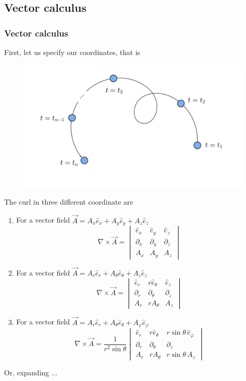 \documentclass[11pt,]{beamer}
\begin{document}
\subsection{Vector calculus}
\begin{frame}
\frametitle{Vector calculus}
	First, let us specify our coordinates, that is
	\begin{figure}
	\includegraphics[page=12,width=1.0\textwidth]{imgs.pdf}
	\end{figure}
\end{frame}
\begin{frame}
	The curl in three different coordinate are
	\begin{enumerate}
	\item For a vector field $\vec{A} = A_x \hat{e}_x + A_y \hat{e}_y + A_z \hat{e}_z$
		\begin{equation}
		\nabla \times \vec{A} = 
		\begin{vmatrix}
		\hat{e}_x & \hat{e}_y & \hat{e}_z\\
		\partial_x & \partial_y & \partial_z\\
		A_x & A_y & A_z
		\end{vmatrix}
		\end{equation}
	\item For a vector field $\vec{A} = A_r \hat{e}_r + A_\theta \hat{e}_\theta + A_z \hat{e}_z$
		\begin{equation}
		\nabla \times \vec{A} = 
		\begin{vmatrix}
		\hat{e}_r & r\hat{e}_\theta & \hat{e}_z\\
		\partial_r & \partial_\theta & \partial_z\\
		A_r & r A_\theta & A_z
		\end{vmatrix}
		\end{equation}
	\item For a vector field $\vec{A} = A_r \hat{e}_r + A_\theta \hat{e}_\theta + A_\varphi \hat{e}_\varphi$
		\begin{equation}
		\nabla \times \vec{A} = 
		\frac{1}{r^2\sin\theta}\begin{vmatrix}
		\hat{e}_r & r\hat{e}_\theta & r\sin\theta\,\hat{e}_\varphi\\
		\partial_r & \partial_\theta & \partial_z\\
		A_r & r A_\theta & r\sin\theta\,A_z
		\end{vmatrix}
		\end{equation}
	\end{enumerate}
	Or, expanding ...
\end{frame}
\end{document}
